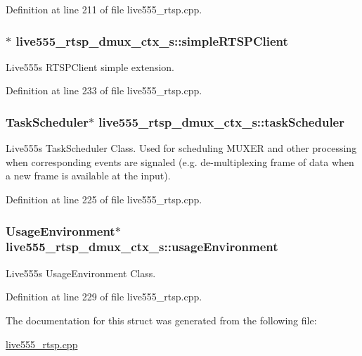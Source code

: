 Definition at line 211 of file live555\+\_\+rtsp.\+cpp.

\subsubsection[{\texorpdfstring{simple\+R\+T\+S\+P\+Client}{simpleRTSPClient}}]{$\ast$ live555\+\_\+rtsp\+\_\+dmux\+\_\+ctx\+\_\+s\+::simple\+R\+T\+S\+P\+Client}\hypertarget{structlive555__rtsp__dmux__ctx__s_a00b7c99aef1216db2e901196d1419059}{}\label{structlive555__rtsp__dmux__ctx__s_a00b7c99aef1216db2e901196d1419059}
Live555\textquotesingle{}s R\+T\+S\+P\+Client simple extension. 

Definition at line 233 of file live555\+\_\+rtsp.\+cpp.

\subsubsection[{\texorpdfstring{task\+Scheduler}{taskScheduler}}]{\setlength{\rightskip}{0pt plus 5cm}Task\+Scheduler$\ast$ live555\+\_\+rtsp\+\_\+dmux\+\_\+ctx\+\_\+s\+::task\+Scheduler}\hypertarget{structlive555__rtsp__dmux__ctx__s_a3211e63d383d152dbaa3348b638af6ae}{}\label{structlive555__rtsp__dmux__ctx__s_a3211e63d383d152dbaa3348b638af6ae}
Live555\textquotesingle{}s Task\+Scheduler Class. Used for scheduling M\+U\+X\+ER and other processing when corresponding events are signaled (e.\+g. de-\/multiplexing frame of data when a new frame is available at the input). 

Definition at line 225 of file live555\+\_\+rtsp.\+cpp.

\subsubsection[{\texorpdfstring{usage\+Environment}{usageEnvironment}}]{\setlength{\rightskip}{0pt plus 5cm}Usage\+Environment$\ast$ live555\+\_\+rtsp\+\_\+dmux\+\_\+ctx\+\_\+s\+::usage\+Environment}\hypertarget{structlive555__rtsp__dmux__ctx__s_ad86f6a45f1dc7215e6fe07ccf91be065}{}\label{structlive555__rtsp__dmux__ctx__s_ad86f6a45f1dc7215e6fe07ccf91be065}
Live555\textquotesingle{}s Usage\+Environment Class. 

Definition at line 229 of file live555\+\_\+rtsp.\+cpp.



The documentation for this struct was generated from the following file\+:\begin{DoxyCompactItemize}
\item 
\hyperlink{live555__rtsp_8cpp}{live555\+\_\+rtsp.\+cpp}\end{DoxyCompactItemize}
